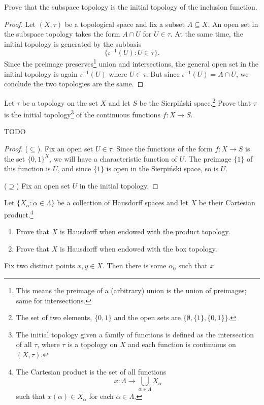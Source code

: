 \documentclass[../../main.tex]{subfiles}
\begin{document}
\begin{problem}[6]
    Prove that the subspace topology is the initial topology of the inclusion function.
\end{problem}
\begin{proof}
    Let $(X, \tau)$ be a topological space and fix a subset $A \subseteq X$.
    An open set in the subspace topology takes the form $A \cap U$ for $U \in \tau$.
    At the same time, the initial topology is generated by the subbasis
    \[
        \{ \iota^{-1}(U) : U \in \tau \}.
    \]
    Since the preimage preserves\footnote{This means the preimage of a (arbitrary) union is the union of preimages; same for intersections.} union and intersections, the general open set in the initial topology is again $\iota^{-1}(U)$ where $U \in \tau$.
    But since $\iota^{-1}(U) = A \cap U$, we conclude the two topologies are the same.
\end{proof}

\begin{problem}[7]
Let $\tau$ be a topology on the set $X$ and let $S$ be the Sierpi\'nski space.\footnote{
	The set of two elements, $\{0, 1\}$ and the open sets are $\{ \emptyset, \{1\}, \{0, 1\} \}$.}
Prove that $\tau$ is the initial topology\footnote{The initial topology given a family of functions is defined as the intersection of all $\tau$, where $\tau$ is a topology on $X$ and each function is continuous on $(X, \tau)$.}
of the continuous functions $f : X \to S$.
\end{problem}
{\huge TODO}
\begin{proof}
	($\subseteq$). Fix an open set $U \in \tau$.
	Since the functions of the form $f : X \to S$ is the set $\{0, 1\}^X$, we will have a characteristic function of $U$.
	The preimage $\{1\}$ of this function is $U$, and since $\{1\}$ is open in the Sierpi\'nski space, so is $U$.

	($\supseteq$) Fix an open set $U$ in the initial topology.
\end{proof}

\begin{problem}
Let $\{ X_\alpha : \alpha \in \Lambda \}$ be a collection of Hausdorff spaces and let $X$ be their Cartesian product.\footnote{
	The Cartesian product is the set of all functions
	\[ x : \Lambda \to \bigcup_{\alpha \in \Lambda} X_\alpha \]
	such that $x(\alpha) \in X_\alpha$ for each $\alpha \in \Lambda$.
}
\end{problem}
\begin{enumerate}[label=(\alph*)]
	\item Prove that $X$ is Hausdorff when endowed with the product topology.
	\item Prove that $X$ is Hausdorff when endowed with the box topology.
\end{enumerate}
Fix two distinct points $x, y \in X$.
Then there is some $\alpha_0$ such that $x$
\end{document}
